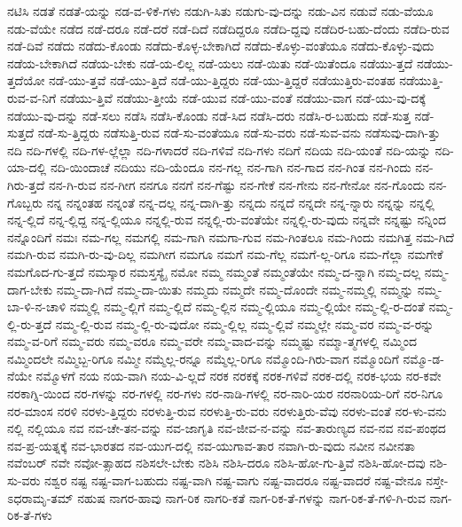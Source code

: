 {ನಟಿಸಿ
ನಡತೆ
ನಡತೆ-ಯನ್ನು
ನಡ-ವ-ಳಿಕೆ-ಗಳು
ನಡುಗಿ-ಸಿತು
ನಡುಗು-ವು-ದನ್ನು
ನಡು-ವಿನ
ನಡುವೆ
ನಡು-ವೆಯೂ
ನಡು-ವೆಯೇ
ನಡೆದ
ನಡೆ-ದರೂ
ನಡೆ-ದರೆ
ನಡೆ-ದಿದೆ
ನಡೆದಿದ್ದರೂ
ನಡೆದಿ-ದ್ದವು
ನಡೆದಿರ-ಬಹು-ದೆಂದು
ನಡೆದಿ-ರುವ
ನಡೆ-ದಿವೆ
ನಡೆದು
ನಡೆದು-ಕೊಂಡು
ನಡೆದು-ಕೊಳ್ಳ-ಬೇಕಾಗಿದೆ
ನಡೆದು-ಕೊಳ್ಳು-ವಂತೆಯೂ
ನಡೆದು-ಕೊಳ್ಳು-ವುದು
ನಡೆಯ-ಬೇಕಾಗಿದೆ
ನಡೆಯ-ಬೇಕು
ನಡೆ-ಯ-ಲಿಲ್ಲ
ನಡೆ-ಯಲು
ನಡೆ-ಯಿತು
ನಡೆ-ಯಿತೆಂದೂ
ನಡೆಯು-ತ್ತದೆ
ನಡೆಯು-ತ್ತದೆಯೋ
ನಡೆ-ಯು-ತ್ತವೆ
ನಡೆ-ಯು-ತ್ತಿದೆ
ನಡೆ-ಯು-ತ್ತಿದ್ದರು
ನಡೆ-ಯು-ತ್ತಿದ್ದರೆ
ನಡೆಯುತ್ತಿರು-ವಂತಹ
ನಡೆಯುತ್ತಿ-ರುವ-ವ-ನಿಗೆ
ನಡೆಯು-ತ್ತಿವೆ
ನಡೆಯು-ತ್ತೀಯೆ
ನಡೆ-ಯುವ
ನಡೆ-ಯು-ವಂತೆ
ನಡೆಯು-ವಾಗ
ನಡೆ-ಯು-ವು-ದಕ್ಕೆ
ನಡೆಯು-ವು-ದನ್ನು
ನಡೆ-ಸಲು
ನಡೆಸಿ
ನಡೆಸಿ-ಕೊಂಡು
ನಡೆ-ಸಿದ
ನಡೆಸಿ-ದರು
ನಡೆಸಿ-ರ-ಬಹುದು
ನಡೆ-ಸುತ್ತ
ನಡೆ-ಸುತ್ತದೆ
ನಡೆ-ಸು-ತ್ತಿದ್ದರು
ನಡೆಸುತ್ತಿ-ರುವ
ನಡೆ-ಸು-ವಂತೆಯೂ
ನಡೆ-ಸು-ವರು
ನಡೆ-ಸುವ-ವನು
ನಡೆಸುವು-ದಾಗಿ-ತ್ತು
ನದಿ
ನದಿ-ಗಳಲ್ಲಿ
ನದಿ-ಗಳ-ಲ್ಲೆಲ್ಲಾ
ನದಿ-ಗಳಾದರೆ
ನದಿ-ಗಳಿವೆ
ನದಿ-ಗಳು
ನದಿಗೆ
ನದಿಯ
ನದಿ-ಯಂತೆ
ನದಿ-ಯನ್ನು
ನದಿ-ಯಾ-ದಲ್ಲಿ
ನದಿ-ಯಿಂದಾಚೆ
ನದಿಯು
ನದಿ-ಯೆಂದೂ
ನನ-ಗಲ್ಲ
ನನ-ಗಾಗಿ
ನನ-ಗಾದ
ನನ-ಗಿಂತ
ನನ-ಗಿಂದು
ನನ-ಗಿರು-ತ್ತದೆ
ನನ-ಗಿ-ರುವ
ನನ-ಗೀಗ
ನನಗೂ
ನನಗೆ
ನನ-ಗೆಷ್ಟು
ನನ-ಗೇಕೆ
ನನ-ಗೇನು
ನನ-ಗೇನೋ
ನನ-ಗೊಂದು
ನನ-ಗೊಬ್ಬರು
ನನ್ನ
ನನ್ನಂತಹ
ನನ್ನಂತೆ
ನನ್ನ-ದಲ್ಲ
ನನ್ನ-ದಾಗಿ-ತ್ತು
ನನ್ನದು
ನನ್ನದೆ
ನನ್ನದೇ
ನನ್ನ-ನ್ನಾರು
ನನ್ನನ್ನು
ನನ್ನಲ್ಲಿ
ನನ್ನ-ಲ್ಲಿದೆ
ನನ್ನ-ಲ್ಲಿದ್ದ
ನನ್ನ-ಲ್ಲಿಯೂ
ನನ್ನಲ್ಲಿ-ರುವ
ನನ್ನಲ್ಲಿ-ರು-ವಂತೆಯೇ
ನನ್ನಲ್ಲಿ-ರು-ವುದು
ನನ್ನವೇ
ನನ್ನಷ್ಟು
ನನ್ನಿಂದ
ನನ್ನೊಂದಿಗೆ
ನಮಃ
ನಮ-ಗಲ್ಲ
ನಮಗಲ್ಲಿ
ನಮ-ಗಾಗಿ
ನಮಗಾ-ಗುವ
ನಮ-ಗಿಂತಲೂ
ನಮ-ಗಿಂದು
ನಮಗಿತ್ತ
ನಮ-ಗಿದೆ
ನಮಗಿ-ರುವ
ನಮಗಿ-ರು-ವು-ದಿಲ್ಲ
ನಮಗೀಗ
ನಮಗೂ
ನಮಗೆ
ನಮ-ಗೆಲ್ಲ
ನಮಗೆ-ಲ್ಲ-ರಿಗೂ
ನಮ-ಗೆಲ್ಲಾ
ನಮಗೇಕೆ
ನಮಗೊದ-ಗು-ತ್ತದೆ
ನಮಸ್ಕಾರ
ನಮಸ್ತಸ್ಯೈ
ನಮೋ
ನಮ್ಮ
ನಮ್ಮಂತೆ
ನಮ್ಮಂತೆಯೇ
ನಮ್ಮ-ದ-ನ್ನಾಗಿ
ನಮ್ಮ-ದಲ್ಲ
ನಮ್ಮ-ದಾಗ-ಬೇಕು
ನಮ್ಮ-ದಾ-ಗಿದೆ
ನಮ್ಮ-ದಾ-ಯಿತು
ನಮ್ಮದು
ನಮ್ಮದೇ
ನಮ್ಮ-ದೊಂದೇ
ನಮ್ಮ-ನಮ್ಮಲ್ಲಿ
ನಮ್ಮನ್ನು
ನಮ್ಮ-ಬಾ-ಳಿ-ನ-ಚಾಳಿ
ನಮ್ಮಲ್ಲಿ
ನಮ್ಮ-ಲ್ಲಿಗೆ
ನಮ್ಮ-ಲ್ಲಿದೆ
ನಮ್ಮ-ಲ್ಲಿನ
ನಮ್ಮ-ಲ್ಲಿಯೂ
ನಮ್ಮ-ಲ್ಲಿಯೇ
ನಮ್ಮ-ಲ್ಲಿ-ರ-ದಂತೆ
ನಮ್ಮ-ಲ್ಲಿ-ರು-ತ್ತದೆ
ನಮ್ಮ-ಲ್ಲಿ-ರುವ
ನಮ್ಮ-ಲ್ಲಿ-ರು-ವುದೋ
ನಮ್ಮ-ಲ್ಲಿಲ್ಲ
ನಮ್ಮ-ಲ್ಲಿವೆ
ನಮ್ಮಲ್ಲೇ
ನಮ್ಮ-ವರ
ನಮ್ಮ-ವ-ರನ್ನು
ನಮ್ಮ-ವ-ರಿಗೆ
ನಮ್ಮ-ವರು
ನಮ್ಮ-ವರೂ
ನಮ್ಮ-ವರೇ
ನಮ್ಮ-ವಾದ-ವನ್ನು
ನಮ್ಮಷ್ಟು
ನಮ್ಮಾ-ತ್ಮಗಳಲ್ಲಿ
ನಮ್ಮಿಂದ
ನಮ್ಮಿಂದಲೇ
ನಮ್ಮಿಬ್ಬ-ರಿಗೂ
ನಮ್ಮೀ
ನಮ್ಮೆಲ್ಲ-ರನ್ನೂ
ನಮ್ಮೆಲ್ಲ-ರಿಗೂ
ನಮ್ಮೊಂದಿ-ಗಿರು-ವಾಗ
ನಮ್ಮೊಂದಿಗೆ
ನಮ್ಮೊ-ಡ-ನೆಯೇ
ನಮ್ಮೊಳಗೆ
ನಯ
ನಯ-ವಾಗಿ
ನಯ-ವಿ-ಲ್ಲದೆ
ನರಕ
ನರಕಕ್ಕೆ
ನರಕ-ಗಳಿವೆ
ನರಕ-ದಲ್ಲಿ
ನರಕ-ಭಯ
ನರ-ಕವೇ
ನರಕಾಗ್ನಿ-ಯಿಂದ
ನರ-ಗಳನ್ನು
ನರ-ಗಳಲ್ಲಿ
ನರ-ಗಳು
ನರ-ನಾಡಿ-ಗಳಲ್ಲಿ
ನರ-ನಾರಿ-ಯರ
ನರನಾರಿಯ-ರಿಗೆ
ನರ-ನಿಗೂ
ನರ-ಮಾಂಸ
ನರಳಿ
ನರಳು-ತ್ತಿದ್ದರು
ನರಳುತ್ತಿ-ರುವ
ನರಳುತ್ತಿ-ರು-ವರು
ನರಳುತ್ತಿರು-ವೆವು
ನರಳು-ವಂತೆ
ನರ-ಳು-ವನು
ನಲ್ಲಿ
ನಲ್ಲಿಯೂ
ನವ
ನವ-ಚೇ-ತನ-ವನ್ನು
ನವ-ಜಾಗೃತಿ
ನವ-ಜೀವ-ನ-ವನ್ನು
ನವ-ತಾರುಣ್ಯದ
ನವ-ನವ
ನವ-ಪಂಥದ
ನವ-ಪ್ರ-ಯತ್ನಕ್ಕೆ
ನವ-ಭಾರತದ
ನವ-ಯುಗ-ದಲ್ಲಿ
ನವ-ಯುಗಾವ-ತಾರ
ನವಾಗಿ-ರು-ವುದು
ನವೀನ
ನವೀನತಾ
ನವೆಂಬರ್
ನವೇ
ನವೋ-ತ್ಸಾಹದ
ನಶಿಸಲೇ-ಬೇಕು
ನಶಿಸಿ
ನಶಿಸಿ-ದರೂ
ನಶಿಸಿ-ಹೋ-ಗು-ತ್ತಿವೆ
ನಶಿಸಿ-ಹೋ-ದವು
ನಶಿ-ಸು-ವರು
ನಶ್ವರ
ನಷ್ಟ
ನಷ್ಟ-ವಾಗ-ಬಹುದು
ನಷ್ಟ-ವಾಗಿ
ನಷ್ಟ-ವಾಗು
ನಷ್ಟ-ವಾದರೂ
ನಷ್ಟ-ವಾದರೆ
ನಷ್ಟ-ವೇನೂ
ನಸ್ತೇ-ಽಧರಾಮೃ-ತಮ್
ನಹುಷ
ನಾಗರ-ಹಾವು
ನಾಗ-ರಿಕ
ನಾಗರಿ-ಕತೆ
ನಾಗ-ರಿಕ-ತೆ-ಗಳನ್ನು
ನಾಗ-ರಿಕ-ತೆ-ಗಳಿ-ಗಿ-ರುವ
ನಾಗ-ರಿಕ-ತೆ-ಗಳು
}
